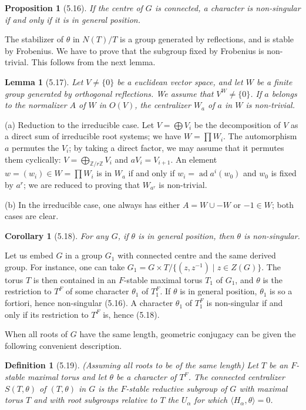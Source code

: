 \documentclass[11pt]{amsart}
\theoremstyle{plain}
\newtheorem{lemma}[theorem]{Lemma}
\newtheorem{proposition}[theorem]{Proposition}
\newtheorem{corollary}[theorem]{Corollary}
\newtheorem{definition}[theorem]{Definition}
\theoremstyle{remark}
\DeclareMathOperator{\ad}{ad}
\begin{document}
\begin{proposition}[5.16]
If the centre of $G$ is connected, a character is non-singular if and only if it is in general position.
\end{proposition}

The stabilizer of $\theta$ in $N(T)/T$ is a group generated by reflections, and is stable by Frobenius. We have to prove that the subgroup fixed by Frobenius is non-trivial. This follows from the next lemma.

\begin{lemma}[5.17]
Let $V \neq \{0\}$ be a euclidean vector space, and let $W$ be a finite group generated by orthogonal reflections. We assume that $V^W \neq \{0\}$. If $a$ belongs to the normalizer $A$ of $W$ in $O(V)$, the centralizer $W_a$ of $a$ in $W$ is non-trivial.
\end{lemma}

(a) Reduction to the irreducible case. Let $V = \bigoplus V_i$ be the decomposition of $V$ as a direct sum of irreducible root systems; we have $W = \prod W_i$. The automorphism $a$ permutes the $V_i$; by taking a direct factor, we may assume that it permutes them cyclically: $V = \bigoplus_{\mathbb{Z}/r\mathbb{Z}} V_i$ and $aV_i = V_{i+1}$. An element $w = (w_i) \in W = \prod W_i$ is in $W_a$ if and only if $w_i = \ad a^i(w_0)$ and $w_0$ is fixed by $a^r$; we are reduced to proving that $W_{a^r}$ is non-trivial.

(b) In the irreducible case, one always has either $A = W \cup -W$ or $-1 \in W$; both cases are clear.

\begin{corollary}[5.18]
For any $G$, if $\theta$ is in general position, then $\theta$ is non-singular.
\end{corollary}

Let us embed $G$ in a group $G_1$ with connected centre and the same derived group. For instance, one can take $G_1 = G \times T/\{(z, z^{-1}) \mid z \in Z(G)\}$. The torus $T$ is then contained in an $F$-stable maximal torus $T_1$ of $G_1$, and $\theta$ is the restriction to $T^F$ of some character $\theta_1$ of $T_1^F$. If $\theta$ is in general position, $\theta_1$ is so a fortiori, hence non-singular (5.16). A character $\theta_1$ of $T_1^F$ is non-singular if and only if its restriction to $T^F$ is, hence (5.18).

When all roots of $G$ have the same length, geometric conjugacy can be given the following convenient description.

\begin{definition}[5.19]
(Assuming all roots to be of the same length) Let $T$ be an $F$-stable maximal torus and let $\theta$ be a character of $T^F$. The connected centralizer $S(T, \theta)$ of $(T, \theta)$ in $G$ is the $F$-stable reductive subgroup of $G$ with maximal torus $T$ and with root subgroups relative to $T$ the $U_\alpha$ for which $\langle H_\alpha, \theta \rangle = 0$.
\end{definition}
\end{document}
